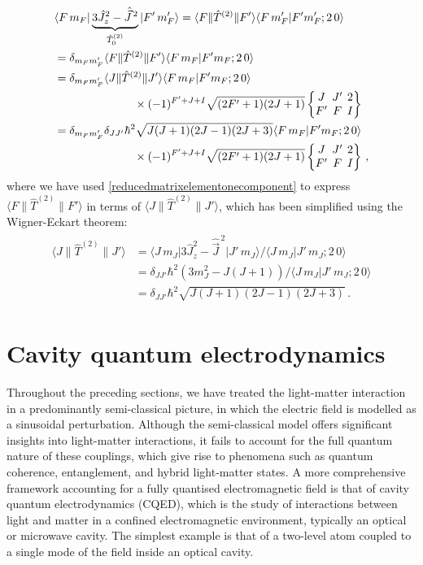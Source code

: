 \documentclass[../Thesis-IJspeert.tex]{subfiles}
\begin{document}
\begin{align}
\begin{split}
&\langle F\,m_F \vert \underbrace{3{\hat{J}}_z^2-\hat{\vec{J}}^{\,2}}_{\hat{T}^{(2)}_0}  \vert F'\, m'_F \rangle = \langle F \| \hat{T}^{(2)} \| F' \rangle \langle F\, m'_F \vert F' m'_F; 2\, 0 \rangle \\ & =\delta_{m_F m'_F} \langle F \| \hat{T}^{(2)} \| F' \rangle \langle F\, m_F \vert F' m_F; 2\, 0 \rangle \\ & =\delta_{m_F m'_F} \langle J \| \hat{T}^{(2)} \| J' \rangle \langle F\, m_F \vert F' m_F; 2\, 0 \rangle \\ &\hspace{7em}\times (-1)^{F'+J+I} \sqrt{(2F'+1)(2J+1)} \tj{J}{J'}{2}{F'}{F}{I}  \\ &= \delta_{m_F m'_F} \delta_{JJ'} \hbar^2 \sqrt{J(J+1)(2J-1)(2J+3)} \langle F\, m_F \vert F' m_F; 2\, 0 \rangle \\ &\hspace{7em}\times(-1)^{F'+J+I} \sqrt{(2F'+1)(2J+1)} \tj{J}{J'}{2}{F'}{F}{I}  \,,
\end{split}
\end{align}
where we have used \autoref{reducedmatrixelementonecomponent} to express $\langle F \| \hat{T}^{(2)} \| F' \rangle$ in terms of $\langle J \| \hat{T}^{(2)} \| J' \rangle$, which has been simplified using the Wigner-Eckart theorem:
\begin{align}
\begin{split}
\langle J \| \hat{T}^{(2)} \| J' \rangle &= \langle J\, m_J \vert 3{\hat{J}}_z^2-\hat{\vec{J}}^{\,2} \vert J' \, m_J \rangle \Big/ \langle J\, m_J \vert J'\, m_J; 2\, 0 \rangle \\ &= \delta_{JJ'}\hbar^2 (3m_J^2-J(J+1)) \Big/ \langle J\, m_J \vert J'\, m_J; 2\, 0 \rangle \\ &= \delta_{JJ'}\hbar^2 \sqrt{J(J+1)(2J-1)(2J+3)} \,.
\end{split}
\end{align}

\section{Cavity quantum electrodynamics}
Throughout the preceding sections, we have treated the light-matter interaction in a predominantly semi-classical picture, in which the electric field is modelled as a sinusoidal perturbation. Although the semi-classical model offers significant insights into light-matter interactions, it fails to account for the full quantum nature of these couplings, which give rise to phenomena such as quantum coherence, entanglement, and hybrid light-matter states. A more comprehensive framework accounting for a fully quantised electromagnetic field is that of cavity quantum electrodynamics (CQED), which is the study of interactions between light and matter in a confined electromagnetic environment, typically an optical or microwave cavity. The simplest example is that of a two-level atom coupled to a single mode of the field inside an optical cavity.
\end{document}
